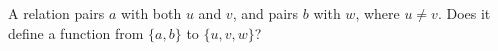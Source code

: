 A relation pairs $a$ with both $u$ and $v$, and pairs $b$ with $w$, where $u\ne v$. Does it define a function from $\{a,b\}$ to $\{u,v,w\}$?
